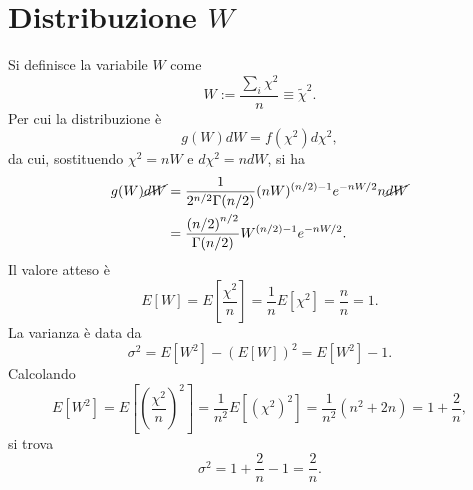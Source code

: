 \documentclass{article}
\theoremstyle{remark}
\begin{document}
\section{Distribuzione \texorpdfstring{$W$}{W}}
Si definisce la variabile $W$ come
\begin{equation}
    W := \frac{\sum\nolimits_i\chi^2}{n} \equiv \tilde{\chi}^2.
\end{equation}
Per cui la distribuzione è
\begin{equation}
    g(W)dW = f(\chi^2)d\chi^2,
\end{equation}
da cui, sostituendo $\chi^2=nW$ e $d\chi^2=ndW$, si ha
\begin{equation}
    \begin{split}
        g(W)\cancel{dW}&=\frac{1}{2^{n/2}\Gamma(n/2)}(nW)^{(n/2) - 1}e^{-nW/2}n\cancel{dW}\\
        &=\frac{\left(n/2\right)^{n/2}}{\Gamma(n/2)}W^{(n/2) - 1}e^{-nW/2}.
    \end{split}
\end{equation}
Il valore atteso è
\begin{equation}
    E[W]=E\left[\frac{\chi^2}{n}\right]=\frac{1}{n}E[\chi^2]=\frac{n}{n}=1.
\end{equation}
La varianza è data da
\begin{equation}
    \sigma^2=E[W^2]-(E[W])^2=E[W^2]-1.
\end{equation}
Calcolando
\begin{equation}
    E[W^2]=E\left[\left(\frac{\chi^2}{n}\right)^2\right]=\frac{1}{n^2}E[(\chi^2)^2]=\frac{1}{n^2}(n^2+2n)=1+\frac{2}{n},
\end{equation}
si trova
\begin{equation}
    \sigma^2=1+\frac{2}{n}-1=\frac{2}{n}.
\end{equation}
\end{document}
